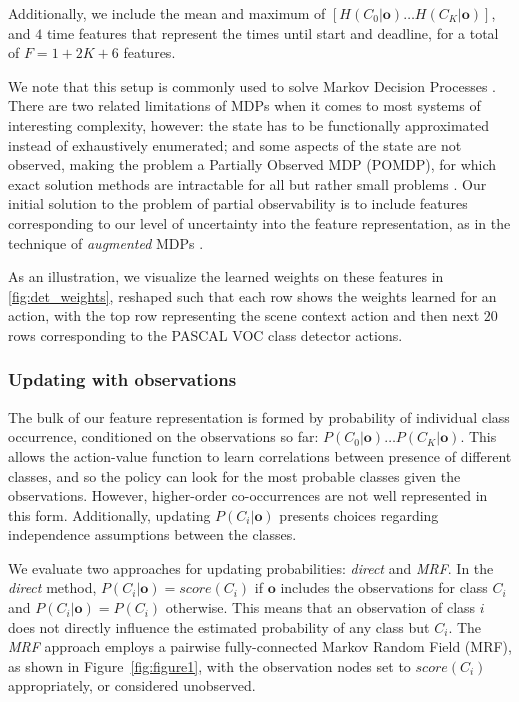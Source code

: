 Additionally, we include the mean and maximum of $[H(C_0|\mathbf{o}) \ldots H(C_K|\mathbf{o})]$, and $4$ time features that represent the times until start and deadline, for a total of $F = 1+2K+6$ features.

We note that this setup is commonly used to solve Markov Decision Processes \cite{Sutton1998}.
There are two related limitations of MDPs when it comes to most systems of interesting complexity, however: the state has to be functionally approximated instead of exhaustively enumerated; and some aspects of the state are not observed, making the problem a Partially Observed MDP (POMDP), for which exact solution methods are intractable for all but rather small problems \cite{Roy2002}.
Our initial solution to the problem of partial observability is to include features corresponding to our level of uncertainty into the feature representation, as in the technique of \emph{augmented} MDPs \cite{Kwok2004}.



As an illustration, we visualize the learned weights on these features in \autoref{fig:det_weights}, reshaped such that each row shows the weights learned for an action, with the top row representing the scene context action and then next $20$ rows corresponding to the PASCAL VOC class detector actions.

\subsubsection{Updating with observations}\label{sec:updating}

The bulk of our feature representation is formed by probability of individual class occurrence, conditioned on the observations so far: $P(C_0|\mathbf{o}) \ldots P(C_K|\mathbf{o})$.
This allows the action-value function to learn correlations between presence of different classes, and so the policy can look for the most probable classes given the observations.
However, higher-order co-occurrences are not well represented in this form.
Additionally, updating $P(C_i|\mathbf{o})$ presents choices regarding independence assumptions between the classes.

We evaluate two approaches for updating probabilities: \emph{direct} and \emph{MRF}.
In the \emph{direct} method, $P(C_i|\mathbf{o}) = score(C_i)$ if $\mathbf{o}$ includes the observations for class $C_i$ and $P(C_i|\mathbf{o}) = P(C_i)$ otherwise.
This means that an observation of class $i$ does not directly influence the estimated probability of any class but $C_i$.
The \emph{MRF} approach employs a pairwise fully-connected Markov Random Field (MRF), as shown in Figure~\ref{fig:figure1}, with the observation nodes set to $score(C_i)$ appropriately, or considered unobserved.

